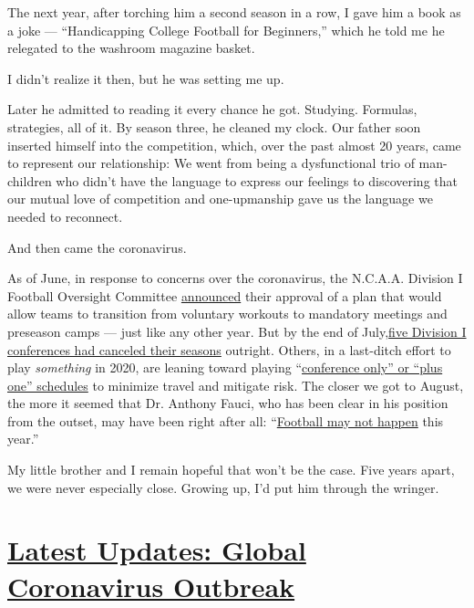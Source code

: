 The next year, after torching him a second season in a row, I gave him a
book as a joke --- ``Handicapping College Football for Beginners,''
which he told me he relegated to the washroom magazine basket.

I didn't realize it then, but he was setting me up.

Later he admitted to reading it every chance he got. Studying. Formulas,
strategies, all of it. By season three, he cleaned my clock. Our father
soon inserted himself into the competition, which, over the past almost
20 years, came to represent our relationship: We went from being a
dysfunctional trio of man-children who didn't have the language to
express our feelings to discovering that our mutual love of competition
and one-upmanship gave us the language we needed to reconnect.

And then came the coronavirus.

As of June, in response to concerns over the coronavirus, the N.C.A.A.
Division I Football Oversight Committee
\href{https://www.espn.com/college-football/story/_/id/29325130/ncaa-division-council-approves-six-week-practice-plan-football}{announced}
their approval of a plan that would allow teams to transition from
voluntary workouts to mandatory meetings and preseason camps --- just
like any other year. But by the end of
July,\href{https://www.sportingnews.com/us/ncaa-football/news/covid-19-college-football-conferences-canceled-season-2020/19mroowdygu9z1tv54mul2vxgw}{five
Division I conferences had canceled their seasons} outright. Others, in
a last-ditch effort to play \emph{something} in 2020, are leaning toward
playing
``\href{https://www.cbssports.com/college-football/news/sec-acc-big-12-considering-plus-one-scheduling-model-with-shortened-2020-season-becoming-an-inevitability/}{conference
only'' or ``plus one'' schedules} to minimize travel and mitigate risk.
The closer we got to August, the more it seemed that Dr. Anthony Fauci,
who has been clear in his position from the outset, may have been right
after all:
``\href{https://www.cnn.com/2020/06/18/us/football-happen-fauci-spt-trnd/index.html}{Football
may not happen} this year.''

My little brother and I remain hopeful that won't be the case. Five
years apart, we were never especially close. Growing up, I'd put him
through the wringer.

\hypertarget{latest-updates-global-coronavirus-outbreak}{%
\section{\texorpdfstring{\href{https://www.nytimes.com/2020/08/01/world/coronavirus-covid-19.html?action=click\&pgtype=Article\&state=default\&region=MAIN_CONTENT_1\&context=storylines_live_updates}{Latest
Updates: Global Coronavirus
Outbreak}}{Latest Updates: Global Coronavirus Outbreak}}\label{latest-updates-global-coronavirus-outbreak}}


